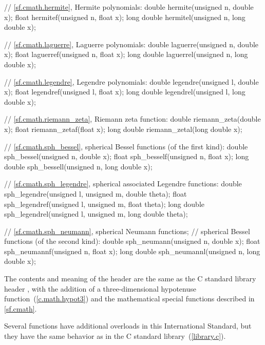 \begin{codeblock}
{  // \ref{sf.cmath.hermite}, Hermite polynomials:
  double       hermite(unsigned n, double x);
  float        hermitef(unsigned n, float x);
  long double  hermitel(unsigned n, long double x);

  // \ref{sf.cmath.laguerre}, Laguerre polynomials:
  double       laguerre(unsigned n, double x);
  float        laguerref(unsigned n, float x);
  long double  laguerrel(unsigned n, long double x);

  // \ref{sf.cmath.legendre}, Legendre polynomials:
  double       legendre(unsigned l, double x);
  float        legendref(unsigned l, float x);
  long double  legendrel(unsigned l, long double x);

  // \ref{sf.cmath.riemann_zeta}, Riemann zeta function:
  double       riemann_zeta(double x);
  float        riemann_zetaf(float x);
  long double  riemann_zetal(long double x);

  // \ref{sf.cmath.sph_bessel}, spherical Bessel functions (of the first kind):
  double       sph_bessel(unsigned n, double x);
  float        sph_besself(unsigned n, float x);
  long double  sph_bessell(unsigned n, long double x);

  // \ref{sf.cmath.sph_legendre}, spherical associated Legendre functions:
  double       sph_legendre(unsigned l, unsigned m, double theta);
  float        sph_legendref(unsigned l, unsigned m, float theta);
  long double  sph_legendrel(unsigned l, unsigned m, long double theta);

  // \ref{sf.cmath.sph_neumann}, spherical Neumann functions;
  // spherical Bessel functions (of the second kind):
  double       sph_neumann(unsigned n, double x);
  float        sph_neumannf(unsigned n, float x);
  long double  sph_neumannl(unsigned n, long double x);
}
\end{codeblock}

\pnum
The contents and meaning of the header 
are the same as the C standard library header ,
with the addition of 
a three-dimensional hypotenuse function~(\ref{c.math.hypot3}) and
the mathematical special functions described in \ref{sf.cmath}.
\begin{note}
Several functions have additional overloads in this International Standard,
but they have the same behavior as in the C standard library~(\ref{library.c}).
\end{note}


